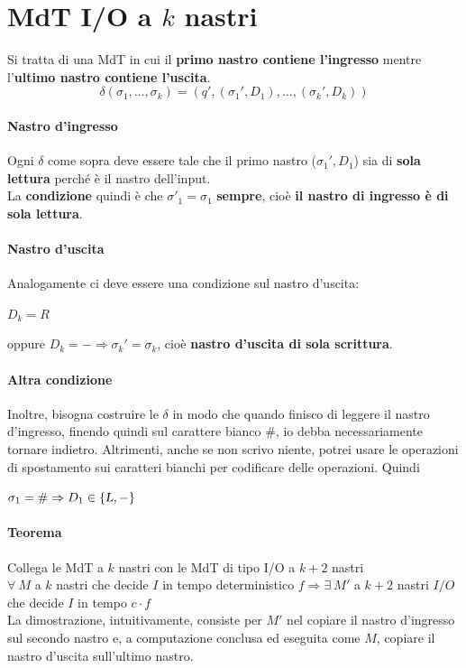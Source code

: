 \documentclass[10pt]{book}
\begin{document}
\section{MdT I/O a $k$ nastri}
Si tratta di una MdT in cui il \textbf{primo nastro contiene l'ingresso} mentre l'\textbf{ultimo nastro contiene l'uscita}.
$$\delta(\sigma_1, \ldots, \sigma_k) = (q', (\sigma_1', D_1), \ldots, (\sigma_k', D_k))$$
\paragraph{Nastro d'ingresso} Ogni $\delta$ come sopra deve essere tale che il primo nastro ($\sigma_1', D_1$) sia di \textbf{sola lettura} perché è il nastro dell'input.\\
La \textbf{condizione} quindi è che $\sigma'_1 = \sigma_1$ \textbf{sempre}, cioè \textbf{il nastro di ingresso è di sola lettura}.
\paragraph{Nastro d'uscita} Analogamente ci deve essere una condizione sul nastro d'uscita:
\begin{list}{}{}
	\item $D_k = R$
	\item oppure $D_k = -\Rightarrow\sigma_k' = \sigma_k$, cioè \textbf{nastro d'uscita di sola scrittura}.
\end{list}
\paragraph{Altra condizione} Inoltre, bisogna costruire le $\delta$ in modo che quando finisco di leggere il nastro d'ingresso, finendo quindi sul carattere bianco $\#$, io debba necessariamente tornare indietro. Altrimenti, anche se non scrivo niente, potrei usare le operazioni di spostamento sui caratteri bianchi per codificare delle operazioni. Quindi \begin{list}{}{}
	\item $\sigma_1 = \# \Rightarrow D_1 \in \{\textsl{L}, -\}$
\end{list}
\paragraph{Teorema} Collega le MdT a $k$ nastri con le MdT di tipo I/O a $k+2$ nastri\\$\forall\:M$ a $k$ nastri che decide $I$ in tempo deterministico $f\Rightarrow\exists\:M'$ a $k+2$ nastri $I/O$ che decide $I$ in tempo $c\cdot f$\\
La dimostrazione, intuitivamente, consiste per $M'$ nel copiare il nastro d'ingresso sul secondo nastro e, a computazione conclusa ed eseguita come $M$, copiare il nastro d'uscita sull'ultimo nastro.
\end{document}
